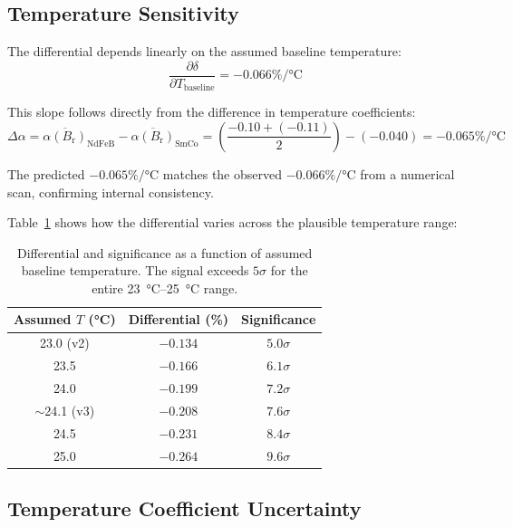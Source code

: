 \documentclass[11pt,letterpaper]{article}
\newcommand{\Br}{B_\mathrm{r}}
\newcommand{\alphar}{\alpha(\Br)}
\begin{document}
\subsection{Temperature Sensitivity}
\label{sec:temp_sensitivity}

The differential depends linearly on the assumed baseline temperature:
\begin{equation}
    \frac{\partial \delta}{\partial T_\mathrm{baseline}} = -0.066\%/\si{\celsius}
    \label{eq:temp_sensitivity}
\end{equation}

This slope follows directly from the difference in temperature coefficients:
\begin{equation}
    \Delta\alpha = \overline{\alphar}_\mathrm{NdFeB} - \overline{\alphar}_\mathrm{SmCo}
    = \left(\frac{-0.10 + (-0.11)}{2}\right) - (-0.040)
    = -0.065\%/\si{\celsius}
\end{equation}

The predicted $-0.065\%/\si{\celsius}$ matches the observed
$-0.066\%/\si{\celsius}$ from a numerical scan, confirming internal
consistency.

Table~\ref{tab:temp_scan} shows how the differential varies across the
plausible temperature range:

\begin{table}[H]
\centering
\caption{Differential and significance as a function of assumed baseline
temperature. The signal exceeds $5\sigma$ for the entire \SIrange{23}{25}{\celsius}
range.}
\label{tab:temp_scan}
\begin{tabular}{@{}ccc@{}}
\toprule
\textbf{Assumed $T$ (\si{\celsius})} & \textbf{Differential (\%)} & \textbf{Significance} \\
\midrule
23.0 (v2) & $-0.134$ & $5.0\sigma$ \\
23.5      & $-0.166$ & $6.1\sigma$ \\
24.0      & $-0.199$ & $7.2\sigma$ \\
$\sim$24.1 (v3) & $-0.208$ & $7.6\sigma$ \\
24.5      & $-0.231$ & $8.4\sigma$ \\
25.0      & $-0.264$ & $9.6\sigma$ \\
\bottomrule
\end{tabular}
\end{table}

\subsection{Temperature Coefficient Uncertainty}
\end{document}
